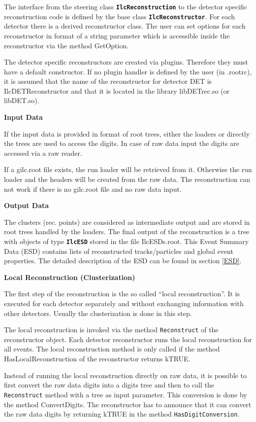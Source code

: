 \documentclass[12pt,a4paper,twoside]{article}
\newcommand{\class}[1]{\texttt{\textbf{#1}}\xspace}
\newcommand{\method}[1]{\texttt{#1}\xspace}
\begin{document}
The interface from the steering class \class{IlcReconstruction} to the
detector specific reconstruction code is defined by the base class
\class{IlcReconstructor}. For each detector there is a derived reconstructor
class. The user can set options for each reconstructor in format of a
string parameter which is accessible inside the reconstructor via the
method GetOption. 

The detector specific reconstructors are created via
plugins. Therefore they must have a default constructor. If no plugin
handler is defined by the user (in .rootrc), it is assumed that the
name of the reconstructor for detector DET is IlcDETReconstructor and
that it is located in the library libDETrec.so (or libDET.so).

\noindent
\textbf{Input Data}

If the input data is provided in format of root trees, either the
loaders or directly the trees are used to access the digits. In case
of raw data input the digits are accessed via a raw reader. 

If a gilc.root file exists, the run loader will be retrieved from
it. Otherwise the run loader and the headers will be created from the
raw data. The reconstruction can not work if there is no gilc.root file
and no raw data input.

\noindent
\textbf{Output Data}

The clusters (rec. points) are considered as intermediate output and
are stored in root trees handled by the loaders. The final output of
the reconstruction is a tree with objects of type \class{IlcESD} stored in the
file IlcESDs.root. This Event Summary Data (ESD) contains lists of
reconstructed tracks/particles and global event properties. The detailed
description of the ESD can be found in section \ref{ESD}.

\noindent
\textbf{Local Reconstruction (Clusterization)}

The first step of the reconstruction is the so called ``local
reconstruction''. It is executed for each detector separately and
without exchanging information with other detectors. Usually the
clusterization is done in this step. 

The local reconstruction is invoked via the method \method{Reconstruct} of the
reconstructor object. Each detector reconstructor runs the local
reconstruction for all events. The local reconstruction method is
only called if the method HasLocalReconstruction of the reconstructor
returns kTRUE. 

Instead of running the local reconstruction directly on raw data, it
is possible to first convert the raw data digits into a digits tree
and then to call the \method{Reconstruct} method with a tree as input
parameter. This conversion is done by the method ConvertDigits. The
reconstructor has to announce that it can convert the raw data digits
by returning kTRUE in the method \method{HasDigitConversion}.
\end{document}
